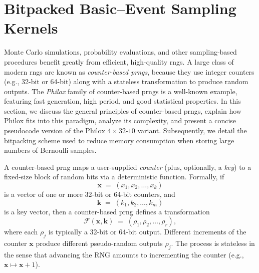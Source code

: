 \chapter{Bitpacked Basic--Event Sampling Kernels}

Monte Carlo simulations, probability evaluations, and other sampling-based procedures benefit greatly from efficient, high-quality \acrfull{rng}s. A large class of modern \acrshort{rng}s are known as \textit{counter-based \acrfull{prng}s}, because they use integer counters (e.g., 32-bit or 64-bit) along with a stateless transformation to produce random outputs. The \emph{Philox} family of counter-based \acrshort{prng}s is a well-known example, featuring fast generation, high period, and good statistical properties. In this section, we discuss the general principles of counter-based \acrshort{prng}s, explain how Philox fits into this paradigm, analyze its complexity, and present a concise pseudocode version of the \(\text{Philox }4\times32\text{-10}\) variant. Subsequently, we detail the bitpacking scheme used to reduce memory consumption when storing large numbers of Bernoulli samples.

A counter-based \acrshort{prng} maps a user-supplied \emph{counter} (plus, optionally, a \emph{key}) to a fixed-size block of random bits via a deterministic function. Formally, if 
\[
  \mathbf{x} \;=\; (x_1, x_2, \ldots, x_k)
\]
is a vector of one or more 32-bit or 64-bit counters, and 
\[
  \mathbf{k} \;=\; (k_1, k_2, \ldots, k_m)
\]
is a key vector, then a counter-based \acrshort{prng} defines a transformation 
\[
   \mathcal{F}(\mathbf{x}, \mathbf{k})
   \;=\;
   (\rho_1, \rho_2, \ldots, \rho_r),
\]
where each \(\rho_j\) is typically a 32-bit or 64-bit output. Different increments of the counter \(\mathbf{x}\) produce different pseudo-random outputs \(\rho_j\). The process is stateless in the sense that advancing the RNG amounts to incrementing the counter (e.g., \(\mathbf{x}\mapsto \mathbf{x} + 1\)).

